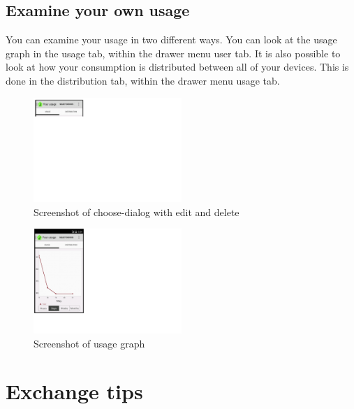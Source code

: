 \subsection{Examine your own usage}
You can examine your usage in two different ways. You can look at the usage graph in the usage tab, within the drawer menu user tab. It is also possible to look at how your consumption is distributed between all of your devices. This is done in the distribution tab, within the drawer menu usage tab. 
\begin{figure}[H]
\centering
\includegraphics[width=0.5\textwidth, clip, trim=0cm 17.5cm 20cm 0cm]{appendix/usermanual/fig/TabsWithinUsage.png}
\caption{Screenshot of choose-dialog with edit and delete}
\end{figure}


\begin{figure}[H]
\centering
\includegraphics[width=0.5\textwidth, clip, trim=0cm 4cm 19.5cm 0cm]{appendix/usermanual/fig/UsageGraph.png}
\caption{Screenshot of usage graph}
\end{figure}


\section{Exchange tips}


